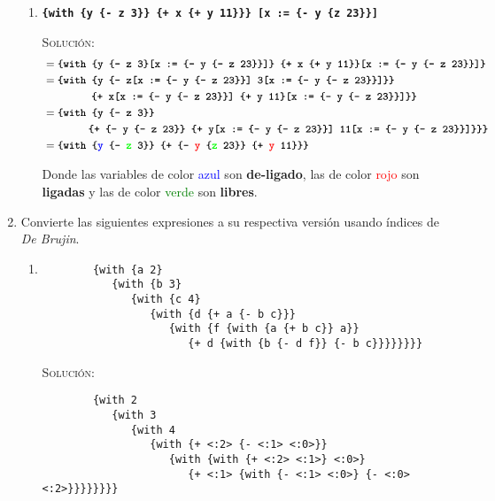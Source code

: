 \documentclass[letterpaper,11pt]{article}
\begin{document}
\begin{enumerate}
\begin{enumerate}
        \item \texttt{\textbf{\{with \{y \{- z 3\}\} \{+ x \{+ y 11\}\}\} 
        [x := \{- y \{z 23\}\}]}}

        \textsc{Solución:}
        \begin{align*}
            &= \texttt{\textbf{\{with \{y \{- z 3\}[x := \{- y \{- z 23\}\}]\} 
                                       \{+ x \{+ y 11\}\}[x := \{- y \{- z 23\}\}]\}}} \\
            &= \texttt{\textbf{\{with \{y \{- z[x := \{- y \{- z 23\}\}] 3[x := \{- y \{- z 23\}\}]\}\}}} \\
            &\; \; \; \; \; \; \; \; \; \; \; \; \; \; \; \; 
            \texttt{\textbf{\{+ x[x := \{- y \{- z 23\}\}] \{+ y 11\}[x := \{- y \{- z 23\}\}]\}\}}} \\
            &= \texttt{\textbf{\{with \{y \{- z 3\}\}}} \\ 
            & \; \; \; \; \; \; \; \; \; \; \; \; \; \; \; 
            \texttt{\textbf{\{+ \{- y \{- z 23\}\} 
                            \{+ y[x := \{- y \{- z 23\}\}] 11[x := \{- y \{- z 23\}\}]\}\}\}}} \\
            &= \texttt{\textbf{\{with \{\textcolor{blue}{y} 
            \{- \textcolor{green}{z} 3\}\} \{+ \{- \textcolor{red}{y} 
            \{\textcolor{green}{z} 23\}\} \{+ \textcolor{red}{y} 11\}\}\}}}
        \end{align*}

        Donde las variables de color \textcolor{blue}{azul} son \textbf{de-ligado},
        las de color \textcolor{red}{rojo} son \textbf{ligadas} y las de color 
        \textcolor{green}{verde} son \textbf{libres}.
    \end{enumerate}

    \newpage
    \item Convierte las siguientes expresiones a su respectiva versión usando
    índices de \textit{De Brujin}.
    \begin{enumerate}
        \item 
        \begin{verbatim}
        {with {a 2} 
           {with {b 3} 
              {with {c 4} 
                 {with {d {+ a {- b c}}} 
                    {with {f {with {a {+ b c}} a}} 
                       {+ d {with {b {- d f}} {- b c}}}}}}}}
        \end{verbatim}

        \textsc{Solución:}
        \begin{verbatim}
        {with 2 
           {with 3 
              {with 4
                 {with {+ <:2> {- <:1> <:0>}} 
                    {with {with {+ <:2> <:1>} <:0>} 
                       {+ <:1> {with {- <:1> <:0>} {- <:0> <:2>}}}}}}}}
        \end{verbatim}


\end{enumerate}
\end{enumerate}
\end{document}
